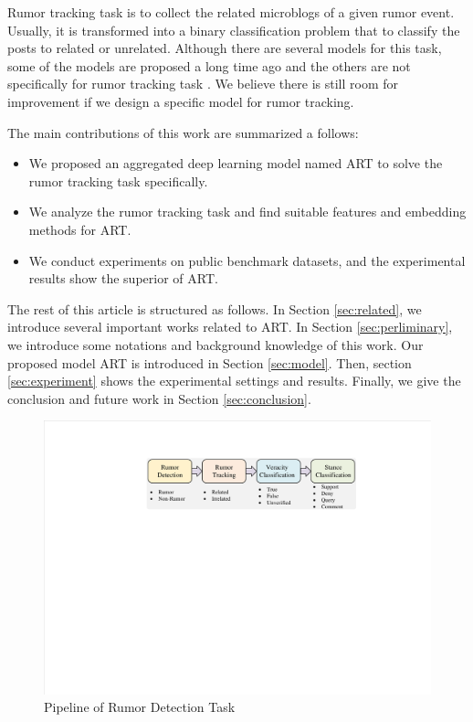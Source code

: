Rumor tracking task is to collect the related microblogs of a given rumor event. Usually, it is transformed into a binary classification problem that to classify the posts to related or unrelated. Although there are several models for this task, some of the models are proposed a long time ago \cite{DBLP:conf/emnlp/QazvinianRRM11} and the others are not specifically for rumor tracking task \cite{DBLP:conf/www/ChengNB20}.
We believe there is still room for improvement if we design a specific model for rumor tracking. 

The main contributions of this work are summarized a follows:
\begin{itemize}
	\item We proposed an aggregated deep learning model named ART to solve the rumor tracking task specifically.
	\item We analyze the rumor tracking task and find suitable features and embedding methods for ART.
	\item We conduct experiments on public benchmark datasets, and the experimental results show the superior of ART.
\end{itemize}

The rest of this article is structured as follows. In Section \ref{sec:related}, we introduce several important works related to ART. In Section \ref{sec:perliminary}, we introduce some notations and background knowledge of this work. Our proposed model ART is introduced in Section \ref{sec:model}. Then, section \ref{sec:experiment} shows the experimental settings and results. Finally, we give the conclusion and future work in Section \ref{sec:conclusion}.

\begin{figure}[tbp]
	\hspace{0ex}
	\vspace{0ex}
	\centering
	\includegraphics[width = \textwidth]{fig/pipeline}
	\caption{Pipeline of Rumor Detection Task}
	\label{fig:pipeline}
\end{figure}
